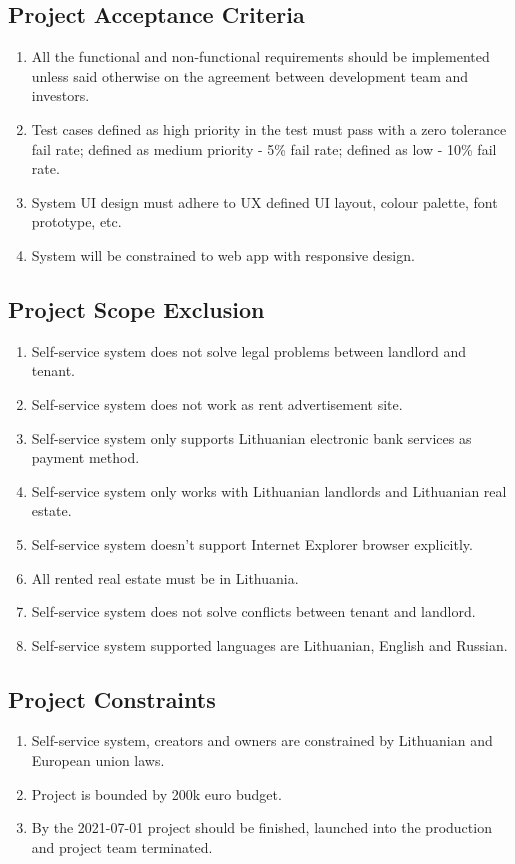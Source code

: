 \documentclass{VUMIFPSkursinis}
\begin{document}
	\subsection{Project Acceptance Criteria}
		\begin{enumerate}
			\item{All the functional and non-functional requirements should be implemented unless said otherwise on the agreement between development team and investors.}
			\item{Test cases defined as high priority in the test must pass with a zero tolerance fail rate; defined as medium priority - 5\% fail rate; defined as low - 10\% fail rate.}
			\item{System UI design must adhere to UX defined UI layout, colour palette, font prototype, etc.}
			\item{System will be constrained to web app with responsive design.}
		\end{enumerate}


	\subsection{Project Scope Exclusion}
		\begin{enumerate}
			\item{Self-service system does not solve legal problems between landlord and tenant.}
			\item{Self-service system does not work as rent advertisement site.}
			\item{Self-service system only supports Lithuanian electronic bank services as payment method.}
			\item{Self-service system only works with Lithuanian landlords and Lithuanian real estate.}
			\item{Self-service system doesn't support Internet Explorer browser explicitly.}
			\item{All rented real estate must be in Lithuania.}
			\item{Self-service system does not solve conflicts between tenant and landlord.}
			\item{Self-service system supported languages are Lithuanian, English and Russian.}
		\end{enumerate}

	\subsection{Project Constraints}
		\begin{enumerate}
			\item{Self-service system, creators and owners are constrained by Lithuanian and European union laws.}
			\item{Project is bounded by 200k euro budget.}
			\item{By the 2021-07-01 project should be finished, launched into the production and project team terminated.}
		\end{enumerate}
\end{document}
